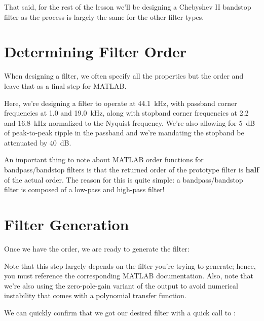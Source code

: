 \documentclass{article}
\begin{document}
That said, for the rest of the lesson we'll be designing a Chebyshev II
bandstop filter as the process is largely the same for the other filter
types.

\section{Determining Filter Order}

When designing a filter, we often specify all the properties but the
order and leave that as a final step for MATLAB.


Here, we're designing a filter to operate at 44.1~kHz, with passband
corner frequencies at 1.0 and 19.0~kHz, along with stopband corner
frequencies at 2.2 and 16.8~kHz normalized to the Nyquist frequency.
We're also allowing for 5~dB of peak-to-peak ripple in the passband and
we're mandating the stopband be attenuated by 40~dB.

An important thing to note about MATLAB order functions for
bandpass/bandstop filters is that the returned order of the prototype
filter is \textbf{half} of the actual order.  The reason for this is
quite simple: a bandpass/bandstop filter is composed of a low-pass and
high-pass filter!

\newpage

\section{Filter Generation}

Once we have the order, we are ready to generate the filter:


Note that this step largely depends on the filter you're trying to
generate; hence, you must reference the corresponding MATLAB
documentation.  Also, note that we're also using the zero-pole-gain
variant of the output to avoid numerical instability that comes with a
polynomial transfer function.

\begin{minipage}{\textwidth}
	We can quickly confirm that we got our desired filter with a
	quick call to :

	\vspace{1em}

\end{minipage}
\end{document}
